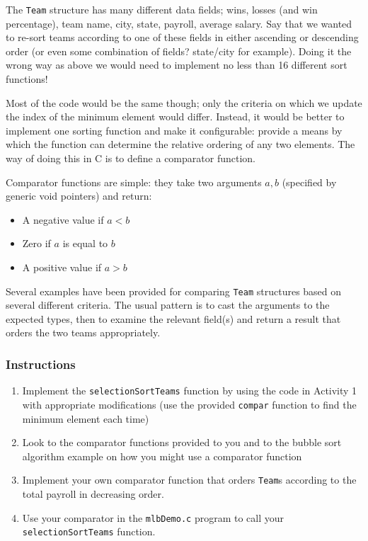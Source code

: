 \documentclass[12pt]{scrartcl}
\begin{document}
The \texttt{Team} structure has many different data fields;
wins, losses (and win percentage), team name, city, state, payroll,
average salary.  Say that we wanted to re-sort teams according to
one of these fields in either ascending or descending order (or even
some combination of fields? state/city for example).  Doing it the
wrong way as above we would need to implement no less than
16 different sort functions!

Most of the code would be the same though; only the criteria on
which we update the index of the minimum element would differ.
Instead, it would be better to implement one sorting function and
make it configurable: provide a means by which the function can
determine the relative ordering of any two elements.  The way of
doing this in C is to define a comparator function.

Comparator functions are simple: they take two arguments
$a, b$ (specified by generic void pointers) and return:
\begin{itemize}
  \item A negative value if $a < b$
  \item Zero if $a$ is equal to $b$
  \item A positive value if $a > b$
\end{itemize}
Several examples have been provided for comparing \texttt{Team}
structures based on several different criteria.  The usual pattern
is to cast the arguments to the expected types, then to examine
the relevant field(s) and return a result that orders the two teams
appropriately.

\subsubsection*{Instructions}

\begin{enumerate}
  \item Implement the \texttt{selectionSortTeams} function
	by using the code in Activity 1 with appropriate modifications
	(use the provided \texttt{compar} function to find the
	minimum element each time)
  \item Look to the comparator functions provided to you and to the
	bubble sort algorithm example on how you might use a comparator
	function
  \item Implement your own comparator function that orders \texttt{Team}s
	according to the total payroll in decreasing order.
  \item Use your comparator in the \texttt{mlbDemo.c} program
	to call your \texttt{selectionSortTeams} function.
\end{enumerate}
\end{document}
